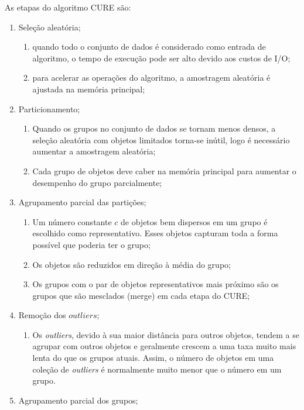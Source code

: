 As etapas do algoritmo CURE são:

\begin{enumerate}
    \item Seleção aleatória;
        \begin{enumerate}
            \item quando todo o conjunto de dados é considerado como entrada de algoritmo, o tempo de execução pode ser alto devido aos custos de I/O;
            \item para acelerar as operações do algoritmo, a amostragem aleatória é ajustada na memória principal;
        \end{enumerate}
    \item Particionamento;
        \begin{enumerate}
            \item Quando os grupos no conjunto de dados se tornam menos densos, a seleção aleatória com objetos limitados torna-se inútil, logo é necessário aumentar a amostragem aleatória;
            \item Cada grupo de objetos deve caber na memória principal para aumentar o desempenho do grupo parcialmente;
        \end{enumerate}
    \item Agrupamento parcial das partições;
        \begin{enumerate}
            \item Um número constante ${c}$ de objetos bem dispersos em um grupo é escolhido como representativo. Esses objetos capturam toda a forma possível que poderia ter o grupo;
            \item Os objetos são reduzidos em direção à média do grupo;
            \item Os grupos com o par de objetos representativos mais próximo são os grupos que são mesclados (merge) em cada etapa do CURE;
        \end{enumerate}
    \item Remoção dos ${outliers}$;
        \begin{enumerate}
            \item Os \textit{outliers}, devido à sua maior distância para outros objetos, tendem a se agrupar com outros objetos e geralmente crescem a uma taxa muito mais lenta do que os grupos atuais. Assim, o número de objetos em uma coleção de \textit{outliers} é normalmente muito menor que o número em um grupo.
        \end{enumerate}
    \item Agrupamento parcial dos grupos;

\end{enumerate}
